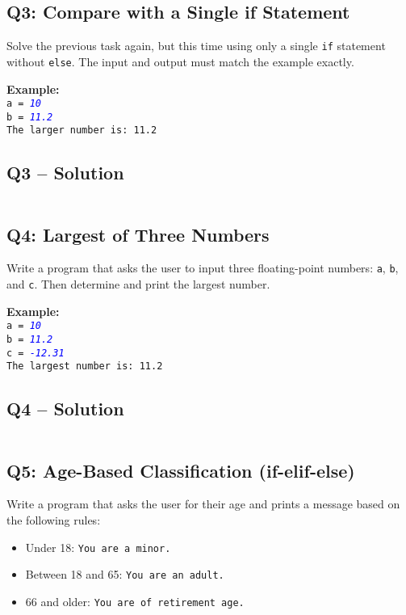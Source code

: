 \documentclass[a4paper,11pt]{article}
\begin{document}
	\subsection*{Q3: Compare with a Single if Statement}
	Solve the previous task again, but this time using only a single \texttt{if} statement without \texttt{else}. The input and output must match the example exactly.
	
	\textbf{Example:}\\
	\texttt{a = \textcolor{blue}{\textit{10}}}\\
	\texttt{b = \textcolor{blue}{\textit{11.2}}}\\
	\texttt{The larger number is: 11.2}
	
		\subsection*{Q3 – Solution}
	\inputminted{python}{Files/1/3.py}
	
	
	\subsection*{Q4: Largest of Three Numbers}
	Write a program that asks the user to input three floating-point numbers: \texttt{a}, \texttt{b}, and \texttt{c}. Then determine and print the largest number.
	
	\textbf{Example:}\\
	\texttt{a = \textcolor{blue}{\textit{10}}}\\
	\texttt{b = \textcolor{blue}{\textit{11.2}}}\\
	\texttt{c = \textcolor{blue}{\textit{-12.31}}}\\
	\texttt{The largest number is: 11.2}
	
		\subsection*{Q4 – Solution}
		\inputminted{python}{Files/1/4.py}
	
	\subsection*{Q5: Age-Based Classification (if-elif-else)}
	Write a program that asks the user for their age and prints a message based on the following rules:
	
	\begin{itemize}
		\item Under 18: \texttt{You are a minor.}
		\item Between 18 and 65: \texttt{You are an adult.}
		\item 66 and older: \texttt{You are of retirement age.}
	\end{itemize}
	
\end{document}

